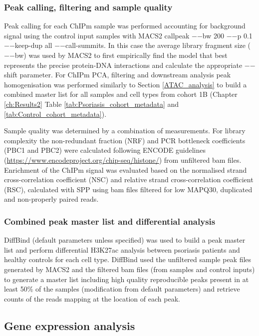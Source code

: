 \subsubsection{Peak calling, filtering and sample quality}
Peak calling for each ChIPm sample was performed accounting for background signal using the control input samples with MACS2 callpeak $-$$-$bw 200 $-$$-$p 0.1 $-$$-$keep-dup all $-$$-$call-summits. In this case the average library fragment size ($-$$-$bw) was used by MACS2 to first empirically find the model that best represents the precise protein-DNA interactions and calculate the appropriate $-$$-$shift parameter. For ChIPm PCA, filtering and downstream analysis peak homogenisation was performed similarly to Section \ref{ATAC_analysis} to build a combined master list for all samples and cell types from cohort 1B (Chapter \ref{ch:Results2} Table \ref{tab:Psoriasis_cohort_metadata} and \ref{tab:Control_cohort_metadata}).

Sample quality was determined by a combination of measurements. For library complexity the non-redundant fraction (NRF) and PCR bottleneck coefficients (PBC1 and PBC2) were calculated following ENCODE guidelines (\url{https://www.encodeproject.org/chip-seq/histone/}) from unfiltered bam files. Enrichment of the ChIPm signal was evaluated based on the normalised strand cross-correlation coefficient (NSC) and relative strand cross-correlation coefficient (RSC), calculated with SPP using bam files filtered for low MAPQ30, duplicated and non-properly paired reads.

\subsubsection{Combined peak master list and differential analysis}
DiffBind (default parameters unless specified) was used to build a peak master list and perform differential H3K27ac analysis between psoriasis patients and healthy controls for each cell type. DiffBind used the unfiltered sample peak files generated by MACS2 and the filtered bam files (from samples and control inputs) to generate a master list including high quality reproducible peaks present in at least 50\% of the samples (modification from default parameters) and retrieve counts of the reads mapping at the location of each peak.



\subsection{Gene expression analysis}

